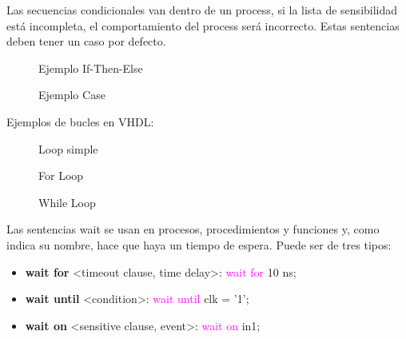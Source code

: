 Las secuencias condicionales van dentro de un process, si la lista de sensibilidad está incompleta, el comportamiento del process será incorrecto. Estas sentencias deben tener un caso por defecto.
\begin{multicols}{2}
	\begin{figure}[H]
		\centering
		
		\caption{Ejemplo If-Then-Else}
	\end{figure}
	\vfill
	\begin{figure}[H]
		\centering
		
		\caption{Ejemplo Case}
	\end{figure}
\end{multicols}

Ejemplos de bucles en VHDL:
\begin{multicols}{3}
	\begin{figure}[H]
		\centering
		
		\caption{Loop simple}
	\end{figure}
	\vfill
	\begin{figure}[H]
		\centering
		
		\caption{For Loop}
	\end{figure}
	\vfill
	\begin{figure}[H]
		\centering
		
		\caption{While Loop}
	\end{figure}
\end{multicols}

Las sentencias wait se usan en procesos, procedimientos y funciones y, como indica su nombre, hace que haya un tiempo de espera. Puede ser de tres tipos:
\begin{itemize}
	\item\textbf{wait for} <timeout clause, time delay>: \textcolor{magenta}{wait for} 10 ns;
	\item\textbf{wait until} <condition>: \textcolor{magenta}{wait until} clk = '1';
	\item\textbf{wait on} <sensitive clause, event>: \textcolor{magenta}{wait on} in1;
\end{itemize}


